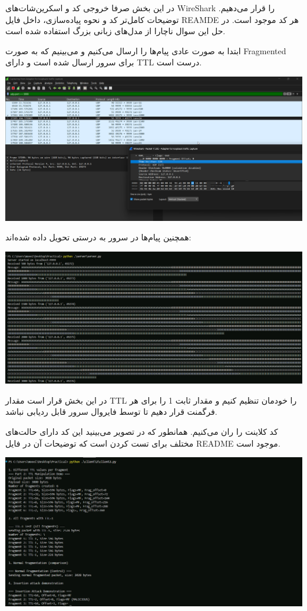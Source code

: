 در این بخش صرفا خروجی کد و اسکرین‌شات‌های WireShark را قرار می‌دهیم. توضیحات کامل‌تر کد و نحوه پیاده‌سازی، داخل فایل REAMDE هر کد موجود است. در حل این سوال ناچارا از مدل‌های زبانی بزرگ استفاده شده است.


ابتدا به صورت عادی پیام‌ها را ارسال می‌کنیم و می‌بینیم که به صورت Fragmented برای سرور ارسال شده است و دارای TTL درست است. 

\begin{center}
	\includegraphics[width=0.8\linewidth]{screenshot001}
\end{center}
	

همچنین پیام‌ها در سرور به درستی تحویل داده شده‌اند:

\begin{center}
	\includegraphics[width=0.8\linewidth]{screenshot002}
\end{center}

\pagebreak



در این بخش قرار است مقدار TTL را خودمان تنظیم کنیم و مقدار ثابت 1 را برای هر فرگمنت قرار دهیم تا توسط فایروال سرور قابل ردیابی نباشد.

کد کلاینت را ران می‌کنیم. همانطور که در تصویر می‌بینید این کد دارای حالت‌های مختلف برای تست کردن است که توضیحات آن در فایل README موجود است.
\begin{center}
	\includegraphics[width=0.8\linewidth]{screenshot003}
\end{center}

